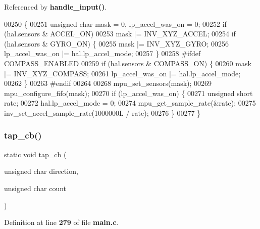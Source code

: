 Referenced by \textbf{ handle\+\_\+input()}.


\begin{DoxyCode}
00250 \{
00251     \textcolor{keywordtype}{unsigned} \textcolor{keywordtype}{char} mask = 0, lp\_accel\_was\_on = 0;
00252     \textcolor{keywordflow}{if} (hal.sensors & ACCEL_ON)
00253         mask |= INV\_XYZ\_ACCEL;
00254     \textcolor{keywordflow}{if} (hal.sensors & GYRO_ON) \{
00255         mask |= INV\_XYZ\_GYRO;
00256         lp\_accel\_was\_on |= hal.lp_accel_mode;
00257     \}
00258 \textcolor{preprocessor}{#ifdef COMPASS\_ENABLED}
00259     \textcolor{keywordflow}{if} (hal.sensors & COMPASS_ON) \{
00260         mask |= INV\_XYZ\_COMPASS;
00261         lp\_accel\_was\_on |= hal.lp_accel_mode;
00262     \}
00263 \textcolor{preprocessor}{#endif}
00264 
00268     mpu\_set\_sensors(mask);
00269     mpu\_configure\_fifo(mask);
00270     \textcolor{keywordflow}{if} (lp\_accel\_was\_on) \{
00271         \textcolor{keywordtype}{unsigned} \textcolor{keywordtype}{short} rate;
00272         hal.lp_accel_mode = 0;
00274         mpu\_get\_sample\_rate(&rate);
00275         inv\_set\_accel\_sample\_rate(1000000L / rate);
00276     \}
00277 \}
\end{DoxyCode}
\mbox{\label{group__eMPL_gab1f482e5c0712ab28da61a1eff46fc75}} 
\subsubsection{tap\+\_\+cb()}
{\footnotesize\ttfamily static void tap\+\_\+cb (\begin{DoxyParamCaption}\item[{unsigned char}]{direction,  }\item[{unsigned char}]{count }\end{DoxyParamCaption})\hspace{0.3cm}{\ttfamily [static]}}



Definition at line \textbf{ 279} of file \textbf{ main.\+c}.


